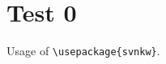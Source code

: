 \documentclass[12pt]{report}
\begin{document}
\chapter{Test 0}
Usage of \texttt{\textbackslash usepackage\{svnkw\}}.
\end{document}
